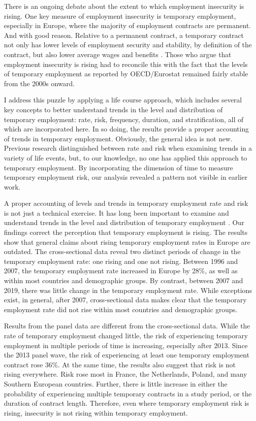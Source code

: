 \documentclass[12pt]{article}
\begin{document}
There is an ongoing debate about the extent to which employment insecurity is rising.  One key measure of employment insecurity is temporary employment, especially in Europe, where the majority of employment contracts are permanent.  And with good reason.  Relative to a permanent contract, a temporary contract not only has lower levels of employment security and stability, by definition of the contract, but also lower average wages and benefits \citep[ch. 4]{eurofound_2015}.  Those who argue that employment insecurity is rising had to reconcile this with the fact that the levels of temporary employment as reported by OECD/Eurostat remained fairly stable from the 2000s onward.  

I address this puzzle by applying a life course approach, which includes several key concepts to better understand trends in the level and distribution of temporary employment: rate, risk, frequency, duration, and stratification, all of which are incorporated here.  In so doing, the results provide a proper accounting of trends in temporary employment.  Obviously, the general idea is not new.  Previous research distinguished between rate and risk when examining trends in a variety of life events, but, to our knowledge, no one has applied this approach to temporary employment.  By incorporating the dimension of time to measure temporary employment risk, our analysis revealed a pattern not visible in earlier work.  

A proper accounting of levels and trends in temporary employment rate and risk is not just a technical exercise.  It has long been important to examine and understand trends in the level and distribution of temporary employment \citep{rodgers_rodgers_1989}.  Our findings correct the perception that temporary employment is rising.  The results show that general claims about rising temporary employment rates in Europe are outdated.  The cross-sectional data reveal two distinct periods of change in the temporary employment rate: one rising and one not rising.  Between 1996 and 2007, the temporary employment rate increased in Europe by 28\%, as well as within most countries and demographic groups.  By contrast, between 2007 and 2019, there was little change in the temporary employment rate.  While exceptions exist, in general, after 2007, cross-sectional data makes clear that the temporary employment rate did not rise within most countries and demographic groups.  

Results from the panel data are different from the cross-sectional data.  While the rate of temporary employment changed little, the risk of experiencing temporary employment in multiple periods of time is increasing, especially after 2013.  Since the 2013 panel wave, the risk of experiencing at least one temporary employment contract rose 36\%.  At the same time, the results also suggest that risk is not rising everywhere.  Risk rose most in France, the Netherlands, Poland, and many Southern European countries.  Further, there is little increase in either the probability of experiencing multiple temporary contracts in a study period, or the duration of contract length.  Therefore, even where temporary employment risk is rising, insecurity is not rising within temporary employment.  
\end{document}
